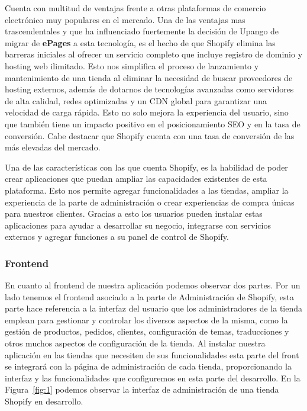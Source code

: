 \documentclass[12pt]{article}
\begin{document}
Cuenta con multitud de ventajas frente a otras plataformas de comercio electrónico muy populares en el mercado. Una de las ventajas
mas trascendentales y que ha influenciado fuertemente  la decisión de Upango de migrar de \textbf{ePages} a esta tecnología, es el hecho de que Shopify elimina
las barreras iniciales al ofrecer un servicio completo que incluye registro de dominio y hosting web ilimitado. Esto nos simplifica el proceso de lanzamiento y mantenimiento
de una tienda al eliminar la necesidad de buscar proveedores de hosting externos, además de dotarnos de tecnologías avanzadas como servidores de alta
calidad, redes optimizadas y un CDN global para garantizar una velocidad de carga rápida. Esto no solo mejora la experiencia del usuario, sino que también 
tiene un impacto positivo en el posicionamiento SEO y en la tasa de conversión. Cabe destacar que Shopify cuenta con una tasa de conversión de las más
elevadas del mercado. \cite{shopify}

Una de las características con las que cuenta Shopify, es la habilidad de poder crear aplicaciones que puedan ampliar las capacidades existentes 
de esta plataforma. Esto nos permite agregar funcionalidades a las tiendas, ampliar la experiencia de la parte de administración
o crear experiencias de compra únicas para nuestros clientes. Gracias a esto los usuarios pueden instalar estas aplicaciones para ayudar a desarrollar
su negocio, integrarse con servicios externos y agregar funciones a su panel de control de Shopify. \cite{shopify-dev}

\subsubsection{Frontend}
En cuanto al frontend de nuestra aplicación podemos observar dos partes. 
Por un lado tenemos el frontend asociado a la parte de Administración de Shopify, 
esta parte hace referencia a la interfaz del usuario que los administradores de la tienda emplean para gestionar y controlar los diversos aspectos de
la misma, como la gestión de productos, pedidos, clientes, configuración de temas, traducciones y otros muchos aspectos de configuración de la tienda.
Al instalar nuestra aplicación en las tiendas que necesiten de sus funcionalidades esta parte del front se integrará con la página de administración de 
cada tienda, proporcionando la interfaz y las funcionalidades que configuremos en esta parte del desarrollo. En la Figura~\ref{fig:1} podemos observar la 
interfaz de administración de una tienda Shopify en desarrollo.
\end{document}
